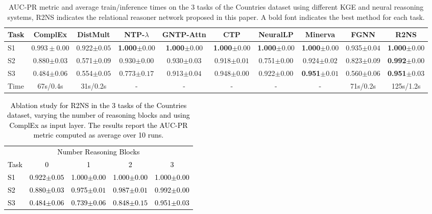 \documentclass[journal]{IEEEtran}
\newcommand{\ar}[1]{\textcolor{black}{#1}}
\begin{document}
\begin{table*}[th]
\centering
\caption{AUC-PR metric and average train/inference times on the $3$ tasks of the Countries dataset using different KGE and neural reasoning systems, R2NS indicates the relational reasoner network proposed in this paper. A bold font indicates the best method for each task.}
{\footnotesize
\begin{tabular}{l|ccccccccc}
Task & %
ComplEx & %
DistMult & NTP-$\lambda$ & GNTP-Attn & CTP & NeuralLP & Minerva & FGNN & R2NS\\
\hline
S1 & %
$0.993\pm 0.00$ & %
0.922$\pm 0.05$ & {\bf 1.000}$\pm 0.00$ & {\bf 1.000}$\pm 0.00$ & {\bf 1.000}$\pm 0.00$ & {\bf 1.000}$\pm 0.00$& {\bf 1.000}$\pm 0.00$&  0.935$\pm 0.04$ & {\bf 1.000}$\pm 0.00$\\
S2 & %
0.880$\pm0.03$ & %
0.571$\pm 0.09$ & 0.930$\pm 0.00$ & 0.930$\pm 0.03$ & 0.918$\pm 0.01$ & 0.751$\pm 0.00$ & 0.924$\pm 0.02$ & 0.823$\pm 0.09$ & {\bf 0.992}$\pm 0.00$\\
S3 & %
0.484$\pm 0.06$ & %
0.554$\pm 0.05$ & 0.773$\pm 0.17$ & 0.913$\pm 0.04$ & 0.948$\pm 0.00$ & 0.922$\pm 0.00$ & {\bf 0.951}$\pm 0.01$ & 0.560$\pm 0.06$ & {\bf 0.951}$\pm 0.03$\\
Time & %
67s/0.4s & 31s/0.2s & - & - & - & - & - & 71s/0.2s & 125s/1.2s
\end{tabular}
}
\label{tab:countries_dataset}
\end{table*}


\begin{table}[th]
\centering
\caption{\ar{Ablation study for R2NS in the $3$ tasks of the Countries dataset, varying the number of reasoning blocks and using ComplEx as input layer. The results report the AUC-PR metric computed as average over 10 runs.}}
{\footnotesize
\ar{\begin{tabular}{l|cccc}
\multicolumn{5}{c}{\hspace{1cm}Number Reasoning Blocks}\\
Task & 0 & 1 & 2 & 3 \\
\hline
S1 & 0.922$\pm 0.05$ & 1.000$\pm 0.00$ & 1.000$\pm 0.00$ & 1.000$\pm 0.00$\\
S2 & 0.880$\pm 0.03$ & 0.975$\pm 0.01$ & 0.987$\pm 0.01$ & 0.992$\pm 0.00$\\
S3 & 0.484$\pm 0.06$ & 0.739$\pm 0.06$ & 0.848$\pm 0.15$ & 0.951$\pm 0.03$\\
\end{tabular}}
}
\label{tab:countries_dataset_ablation}
\end{table}
\end{document}
